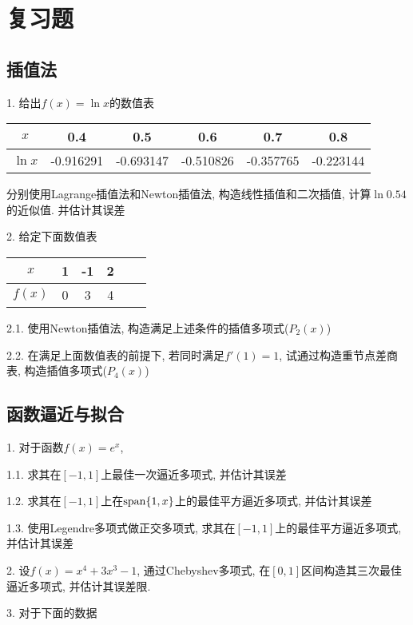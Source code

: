 \chapter{复习题}

\section*{插值法}
1. 给出$f(x)=\ln x$的数值表

\begin{table}[h!]
    \begin{tabular}{c|ccccc}
        \hline
        $x$&0.4&0.5&0.6&0.7&0.8\\
        \hline
        $\ln x$&-0.916291&-0.693147&-0.510826&-0.357765&-0.223144\\
        \hline
    \end{tabular}
\end{table}

分别使用Lagrange插值法和Newton插值法, 构造线性插值和二次插值, 计算$\ln0.54$的近似值. 并估计其误差

2. 给定下面数值表
\begin{table}[h!]
    \begin{tabular}{c|ccccc}
        \hline
        $x$&1&-1&2\\
        \hline
        $f(x)$&0&3&4\\
        \hline
    \end{tabular}
\end{table}

2.1. 使用Newton插值法, 构造满足上述条件的插值多项式($P_2(x)$)

2.2. 在满足上面数值表的前提下, 若同时满足$f'(1)=1$, 试通过构造重节点差商表, 构造插值多项式($P_4(x)$)

\section*{函数逼近与拟合}

1. 对于函数$f(x)=e^x$, 

1.1. 求其在$[-1,1]$上最佳一次逼近多项式, 并估计其误差

1.2. 求其在$[-1,1]$上在$\text{span}\{1,x\}$上的最佳平方逼近多项式, 并估计其误差

1.3. 使用Legendre多项式做正交多项式, 求其在$[-1,1]$上的最佳平方逼近多项式, 并估计其误差

2. 设$f(x)=x^4+3x^3-1$, 通过Chebyshev多项式, 在$[0,1]$区间构造其三次最佳逼近多项式, 并估计其误差限.

3. 对于下面的数据

